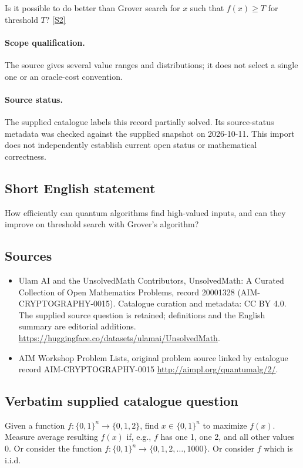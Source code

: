\documentclass[11pt]{article}
\begin{document}
Is it possible to do better than Grover search for $x$ such that $f(x) \geq T$ for threshold $T$? \href{http://aimpl.org/quantumalg/2/}{[S2]}
\paragraph{Scope qualification.}
The source gives several value ranges and distributions; it does not select a single one or an oracle-cost convention.
\paragraph{Source status.}
The supplied catalogue labels this record partially solved. Its source-status metadata was checked against the supplied snapshot on 2026-10-11. This import does not independently establish current open status or mathematical correctness.
\subsection{Short English statement}
How efficiently can quantum algorithms find high-valued inputs, and can they improve on threshold search with Grover's algorithm?
\subsection{Sources}
\begin{itemize}
\item[S1] Ulam AI and the UnsolvedMath Contributors, UnsolvedMath: A Curated Collection of Open Mathematics Problems, record 20001328 (AIM-CRYPTOGRAPHY-0015). Catalogue curation and metadata: CC BY 4.0. The supplied source question is retained; definitions and the English summary are editorial additions.
\url{https://huggingface.co/datasets/ulamai/UnsolvedMath}.
\item[S2] AIM Workshop Problem Lists, original problem source linked by catalogue record AIM-CRYPTOGRAPHY-0015
\url{http://aimpl.org/quantumalg/2/}.
\end{itemize}
\subsection{Verbatim supplied catalogue question}
Given a function $f:\{0,1\}^n \to \{0,1,2\}$, find $x\in \{0,1\}^n$ to maximize $f(x)$. Measure average resulting $f(x)$ if, e.g., $f$ has one 1, one 2, and all other values 0. Or consider the function $f:\{0,1\}^n \to \{0,1,2, \dots, 1000\}$. Or consider $f$ which is i.i.d.
\end{document}

